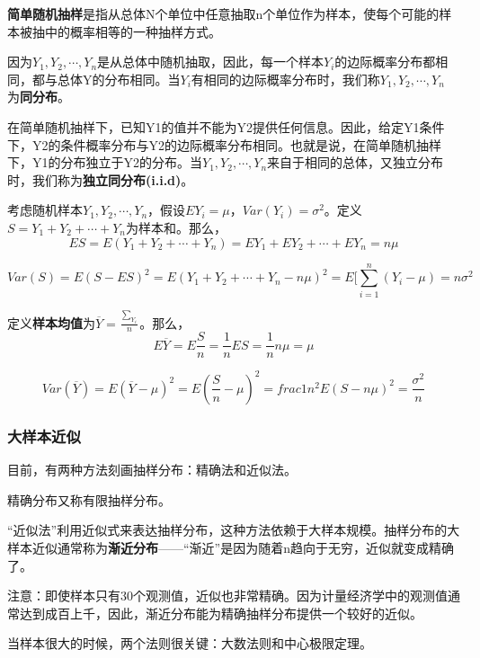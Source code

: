 \documentclass[cn,12pt,math=newtx,citestyle=gb7714-2015,bibstyle=gb7714-2015]{elegantbook}
\begin{document}
	\textbf{简单随机抽样}是指从总体N个单位中任意抽取n个单位作为样本，使每个可能的样本被抽中的概率相等的一种抽样方式。
	
	因为$Y_1,Y_2,\cdots,Y_n$是从总体中随机抽取，因此，每一个样本$Y_i$的边际概率分布都相同，都与总体Y的分布相同。当$Y_i$有相同的边际概率分布时，我们称$Y_1,Y_2,\cdots,Y_n$ 为\textbf{同分布}。
	
	在简单随机抽样下，已知Y1的值并不能为Y2提供任何信息。因此，给定Y1条件下，Y2的条件概率分布与Y2的边际概率分布相同。也就是说，在简单随机抽样下，Y1的分布独立于Y2的分布。当$Y_1,Y_2,\cdots,Y_n$来自于相同的总体，又独立分布时，我们称为\textbf{独立同分布(i.i.d)}。
	
	考虑随机样本${Y_1,Y_2,\cdots,Y_n}$，假设$EY_i=\mu$，$Var(Y_i)=\sigma^2$。定义$S=Y_1+Y_2+\cdots+Y_n$为样本和。那么，
	\begin{equation}
		ES=E(Y_1+Y_2+\cdots+Y_n)=EY_1+EY_2+\cdots+EY_n=n\mu
	\end{equation}
	
	\begin{equation}
		Var(S)=E(S-ES)^2=E(Y_1+Y_2+\cdots+Y_n-n\mu)^2=E[\sum_{i=1}^n{(Y_i-\mu)}=n\sigma^2
	\end{equation}
	
	定义\textbf{样本均值}为$\overline{Y}=\frac{\sum_{Y_i}}{n}$。那么，
	\begin{equation}
		E\overline{Y}=E\frac{S}{n}=\frac{1}{n}ES=\frac{1}{n}n\mu=\mu
	\end{equation}
	
	\begin{equation}
		Var(\overline{Y})=E(\overline{Y}-\mu)^2=E(\frac{S}{n}-\mu)^2=frac{1}{n^2}E(S-n\mu)^2=\frac{\sigma^2}{n}
	\end{equation}
	
	\subsubsection{大样本近似}
	目前，有两种方法刻画抽样分布：精确法和近似法。
	
	精确分布又称有限抽样分布。
	
	“近似法”利用近似式来表达抽样分布，这种方法依赖于大样本规模。抽样分布的大样本近似通常称为\textbf{渐近分布}——“渐近”是因为随着n趋向于无穷，近似就变成精确了。
	
	注意：即使样本只有30个观测值，近似也非常精确。因为计量经济学中的观测值通常达到成百上千，因此，渐近分布能为精确抽样分布提供一个较好的近似。
	
	当样本很大的时候，两个法则很关键：大数法则和中心极限定理。
	
\end{document}
